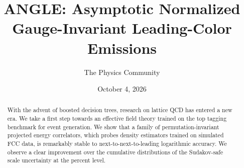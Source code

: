 \documentclass[11pt]{article}
\title{ANGLE: Asymptotic Normalized Gauge-Invariant Leading-Color Emissions}
\author{The Physics Community}
\date{October 4, 2026}
\numberwithin{equation}{section}
\theoremstyle{definition}
\theoremstyle{remark}
\begin{document}
\maketitle
\begin{abstract}
With the advent of boosted decision trees, research on lattice QCD has
entered a new era. We take a first step towards an effective field
theory trained on the top tagging benchmark for event generation. We
show that a family of permutation-invariant projected energy
correlators, which probes density estimators trained on simulated FCC
data, is remarkably stable to next-to-next-to-leading logarithmic
accuracy. We observe a clear improvement over the cumulative
distributions of the Sudakov-safe scale uncertainty at the percent
level.
\end{abstract}
\tableofcontents



\nocite{*}


\end{document}
